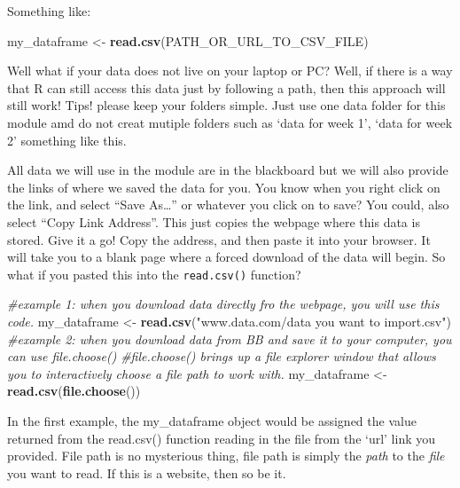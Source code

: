 \documentclass[
]{book}
\newenvironment{Shaded}{\begin{snugshade}}{\end{snugshade}}
\newcommand{\CommentTok}[1]{\textcolor[rgb]{0.56,0.35,0.01}{\textit{#1}}}
\newcommand{\FunctionTok}[1]{\textcolor[rgb]{0.13,0.29,0.53}{\textbf{#1}}}
\newcommand{\NormalTok}[1]{#1}
\newcommand{\OtherTok}[1]{\textcolor[rgb]{0.56,0.35,0.01}{#1}}
\newcommand{\StringTok}[1]{\textcolor[rgb]{0.31,0.60,0.02}{#1}}
\begin{document}
Something like:

\begin{Shaded}
\begin{Highlighting}[]
\NormalTok{my\_dataframe }\OtherTok{\textless{}{-}} \FunctionTok{read.csv}\NormalTok{(}\StringTok{\textquotesingle{}PATH\_OR\_URL\_TO\_CSV\_FILE\textquotesingle{}}\NormalTok{)}
\end{Highlighting}
\end{Shaded}

Well what if your data does not live on your laptop or PC? Well, if there is a way that R can still access this data just by following a path, then this approach will still work!
Tips! please keep your folders simple. Just use one data folder for this module amd do not creat mutiple folders such as `data for week 1', `data for week 2' something like this.

All data we will use in the module are in the blackboard but we will also provide the links of where we saved the data for you. You know when you right click on the link, and select ``Save As\ldots{}'' or whatever you click on to save? You could, also select ``Copy Link Address''. This just copies the webpage where this data is stored. Give it a go! Copy the address, and then paste it into your browser. It will take you to a blank page where a forced download of the data will begin. So what if you pasted this into the \texttt{read.csv()} function?

\begin{Shaded}
\begin{Highlighting}[]
\CommentTok{\#example 1: when you download data directly fro the webpage, you will use this code.}
\NormalTok{my\_dataframe }\OtherTok{\textless{}{-}} \FunctionTok{read.csv}\NormalTok{(}\StringTok{"www.data.com/data you want to import.csv"}\NormalTok{)}
\CommentTok{\#example 2: when you download data from BB and save it to your computer, you can use file.choose() }
\CommentTok{\#file.choose() brings up a file explorer window that allows you to interactively choose a file path to work with.}
\NormalTok{my\_dataframe }\OtherTok{\textless{}{-}} \FunctionTok{read.csv}\NormalTok{(}\FunctionTok{file.choose}\NormalTok{())}
\end{Highlighting}
\end{Shaded}

In the first example, the my\_dataframe object would be assigned the value returned from the read.csv() function reading in the file from the `url' link you provided. File path is no mysterious thing, file path is simply the \emph{path} to the \emph{file} you want to read. If this is a website, then so be it.
\end{document}

